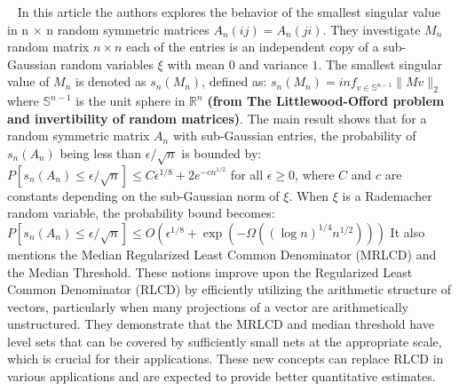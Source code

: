 ~\cite{jain2020smallest}
In this article the authors explores the behavior of the smallest singular value in n $\times$ n random symmetric matrices  $A_n(ij) = A_n(ji)$. 
They investigate $M_n$ random matrix $n\times n$ each of the entries is an independent copy of a sub-Gaussian random variables $\xi$ with mean $0$ and variance $1$.
The smallest singular value of $M_n$ is denoted as $s_n(M_n)$, defined as: $s_n(M_n) = inf_{v \in \mathbb{S}^{n-1}} \|Mv\|_2$ where $\mathbb{S}^{n-1}$ is the unit sphere in $\mathbb{R}^n$ \textbf{(from The Littlewood-Offord problem and invertibility of random matrices)}.
The main result shows that for a random symmetric matrix $A_n$ with sub-Gaussian entries, the probability of $s_n(A_n)$ being less than $\epsilon/\sqrt{n}$ is bounded by: $P[s_n(A_n)\leq \epsilon/\sqrt{n}]\leq C \epsilon^{1/8}+2e^{-c n^{1/2}}$ for all $\epsilon \geq 0$, where $C$ and $c$ are constants depending on the sub-Gaussian norm of $\xi$.
When $\xi$ is a Rademacher random variable, the probability bound becomes: $P[s_n(A_n) \leq \epsilon / \sqrt{n}] \leq O(\epsilon^{1/8}+ \exp(-\Omega((\log{n})^{1/4}n^{1/2})))$
It also mentions the Median Regularized Least Common Denominator (MRLCD) and the Median Threshold.
These notions improve upon the Regularized Least Common Denominator (RLCD) by efficiently utilizing the arithmetic structure of vectors, particularly when many projections of a vector are arithmetically unstructured.
They demonstrate that the MRLCD and median threshold have level sets that can be covered by sufficiently small nets at the appropriate scale, which is crucial for their applications. 
These new concepts can replace RLCD in various applications and are expected to provide better quantitative estimates. 
 